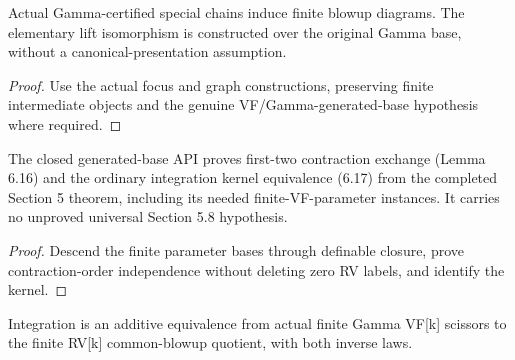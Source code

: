 \begin{lemma}

\label{s6-special}


\leanok

Actual Gamma-certified special chains induce finite blowup diagrams. The elementary lift isomorphism is constructed over the original Gamma base, without a canonical-presentation assumption.

\end{lemma}

\begin{proof}


\leanok

Use the actual focus and graph constructions, preserving finite intermediate objects and the genuine VF/Gamma-generated-base hypothesis where required.

\end{proof}

\begin{theorem}

\label{s6-closed-input}


\leanok

The closed generated-base API proves first-two contraction exchange (Lemma 6.16) and the ordinary integration kernel equivalence (6.17) from the completed Section 5 theorem, including its needed finite-VF-parameter instances. It carries no unproved universal Section 5.8 hypothesis.

\end{theorem}

\begin{proof}


\leanok

Descend the finite parameter bases through definable closure, prove contraction-order independence without deleting zero RV labels, and identify the kernel.

\end{proof}

\begin{proposition}

\label{s6-18}


\leanok

Integration is an additive equivalence from actual finite Gamma VF[k] scissors to the finite RV[k] common-blowup quotient, with both inverse laws.

\end{proposition}

